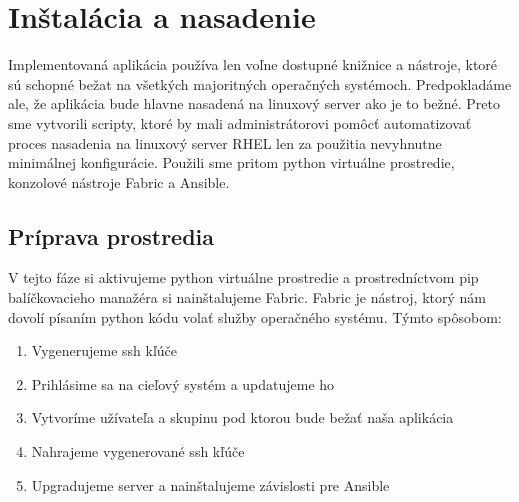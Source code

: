 \section{Inštalácia a nasadenie}
Implementovaná aplikácia používa len voľne dostupné knižnice a nástroje, ktoré sú schopné bežat na všetkých majoritných operačných systémoch. Predpokladáme ale, že aplikácia bude hlavne nasadená na linuxový server ako je to bežné. Preto sme vytvorili scripty, ktoré by mali administrátorovi pomôcť automatizovať proces nasadenia na linuxový server RHEL len za použitia nevyhnutne minimálnej konfigurácie. Použili sme pritom python virtuálne prostredie, konzolové nástroje Fabric a Ansible.

\subsection{Príprava prostredia}
V tejto fáze si aktivujeme python virtuálne prostredie a prostredníctvom pip balíčkovacieho manažéra si nainštalujeme Fabric.
Fabric je nástroj, ktorý nám dovolí písaním python kódu volať služby operačného systému. Týmto spôsobom: 

\begin{enumerate}
  \item Vygenerujeme ssh kľúče
  \item Prihlásime sa na cieľový systém a updatujeme ho
  \item Vytvoríme užívateľa a skupinu pod ktorou bude bežať naša aplikácia
  \item Nahrajeme vygenerované ssh kľúče
  \item Upgradujeme server a nainštalujeme závislosti pre Ansible
\end{enumerate}

\subsection{}